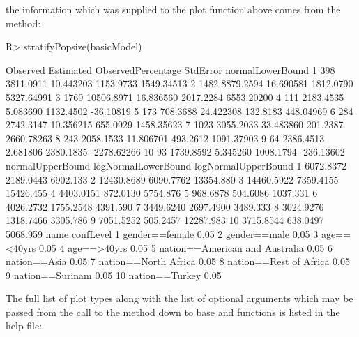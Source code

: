 \documentclass[
]{jss}
\newcommand{\1}{\mathcal{I}} \newcommand{\bx}{\boldsymbol{x}}
\begin{document}
the information which was supplied to the plot function above comes from
the  method: \small

\begin{CodeChunk}
\begin{CodeInput}
R> stratifyPopsize(basicModel)
\end{CodeInput}
\begin{CodeOutput}
   Observed  Estimated ObservedPercentage  StdError normalLowerBound
1       398  3811.0911          10.443203 1153.9733       1549.34513
2      1482  8879.2594          16.690581 1812.0790       5327.64991
3      1769 10506.8971          16.836560 2017.2284       6553.20200
4       111  2183.4535           5.083690 1132.4502        -36.10819
5       173   708.3688          24.422308  132.8183        448.04969
6       284  2742.3147          10.356215  655.0929       1458.35623
7      1023  3055.2033          33.483860  201.2387       2660.78263
8       243  2058.1533          11.806701  493.2612       1091.37903
9        64  2386.4513           2.681806 2380.1835      -2278.62266
10       93  1739.8592           5.345260 1008.1794       -236.13602
   normalUpperBound logNormalLowerBound logNormalUpperBound
1         6072.8372           2189.0443            6902.133
2        12430.8689           6090.7762           13354.880
3        14460.5922           7359.4155           15426.455
4         4403.0151            872.0130            5754.876
5          968.6878            504.6086            1037.331
6         4026.2732           1755.2548            4391.590
7         3449.6240           2697.4900            3489.333
8         3024.9276           1318.7466            3305.786
9         7051.5252            505.2457           12287.983
10        3715.8544            638.0497            5068.959
                             name confLevel
1                  gender==female      0.05
2                    gender==male      0.05
3                     age==<40yrs      0.05
4                     age==>40yrs      0.05
5  nation==American and Australia      0.05
6                    nation==Asia      0.05
7            nation==North Africa      0.05
8          nation==Rest of Africa      0.05
9                 nation==Surinam      0.05
10                 nation==Turkey      0.05
\end{CodeOutput}
\end{CodeChunk}

\normalsize

The full list of plot types along with the list of optional arguments
which may be passed from the call to the  method down to base
 and  functions is listed in the help file:
\end{document}
